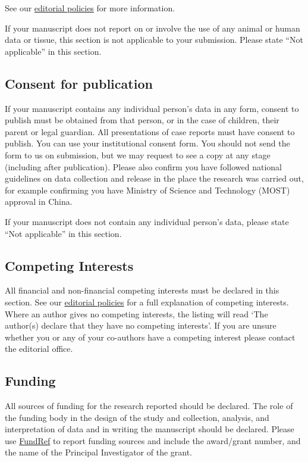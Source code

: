 \documentclass[a4paper,num-refs]{oup-contemporary}
\begin{document}
See our \href{https://academic.oup.com/gigascience/pages/editorial_policies_and_reporting_standards}{editorial policies} for more information.

If your manuscript does not report on or involve the use of any animal or human data or tissue, this section is not applicable to your submission. Please state ``Not applicable'' in this section.

\subsection{Consent for publication}

If your manuscript contains any individual person's data in any form, consent to publish must be obtained from that person, or in the case of children, their parent or legal guardian. All presentations of case reports must have consent to publish. You can use your institutional consent form. You should not send the form to us on submission, but we may request to see a copy at any stage (including after publication). Please also confirm you have followed national guidelines on data collection and release in the place the research was carried out, for example confirming you have Ministry of Science and Technology (MOST) approval in China.

If your manuscript does not contain any individual person's data, please state ``Not applicable'' in this section.

\subsection{Competing Interests}

All financial and non-financial competing interests must be declared in this section. See our \href{https://academic.oup.com/gigascience/pages/editorial_policies_and_reporting_standards}{editorial policies} for a full explanation of competing interests. Where an author gives no competing interests, the listing will read `The author(s) declare that they have no competing interests'. If you are unsure whether you or any of your co-authors have a competing interest please contact the editorial office.


\subsection{Funding}

All sources of funding for the research reported should be declared. The role of the funding body in the design of the study and collection, analysis, and interpretation of data and in writing the manuscript should be declared. Please use \href{http://www.crossref.org/fundingdata/}{FundRef} to report funding sources and include the award/grant number, and the name of the Principal Investigator of the grant.
\end{document}
